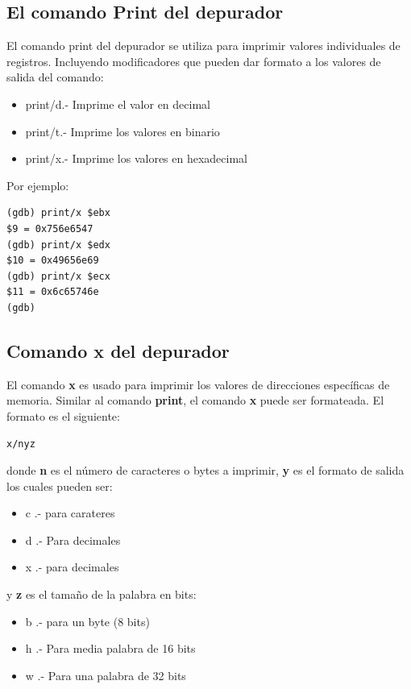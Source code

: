\documentclass[12pt, twoside]{report}
\begin{document}
\subsection{El comando Print del depurador}

El comando print del depurador se utiliza para imprimir valores individuales de registros. Incluyendo modificadores que pueden dar formato a los valores de salida del comando:

\begin{itemize}
\item print/d.- Imprime el valor en decimal
\item print/t.- Imprime los valores en binario
\item print/x.- Imprime los valores en hexadecimal 
\end{itemize}

Por ejemplo:
\begin{lstlisting}[language={[x86masm]Assembler}]
(gdb) print/x $ebx
$9 = 0x756e6547
(gdb) print/x $edx
$10 = 0x49656e69
(gdb) print/x $ecx
$11 = 0x6c65746e
(gdb)
\end{lstlisting}

\subsection{Comando x del depurador}

El comando \textbf{x} es usado para imprimir los valores de direcciones específicas de memoria. Similar al comando \textbf{print}, el comando \textbf{x} puede ser formateada. El formato es el siguiente:
\begin{lstlisting}[language={[x86masm]Assembler}]
x/nyz
\end{lstlisting}

donde \textbf{n} es el número de caracteres o bytes a imprimir, \textbf{y} es el formato de salida los cuales pueden ser:

\begin{itemize}
\item c .- para carateres
\item d .- Para decimales
\item x .- para decimales
\end{itemize}

y \textbf{z} es el tamaño de la palabra en bits:

\begin{itemize}
\item b .- para un byte (8 bits)
\item h .- Para media palabra de 16 bits
\item w .- Para una palabra de 32 bits
\end{itemize}
\end{document}
